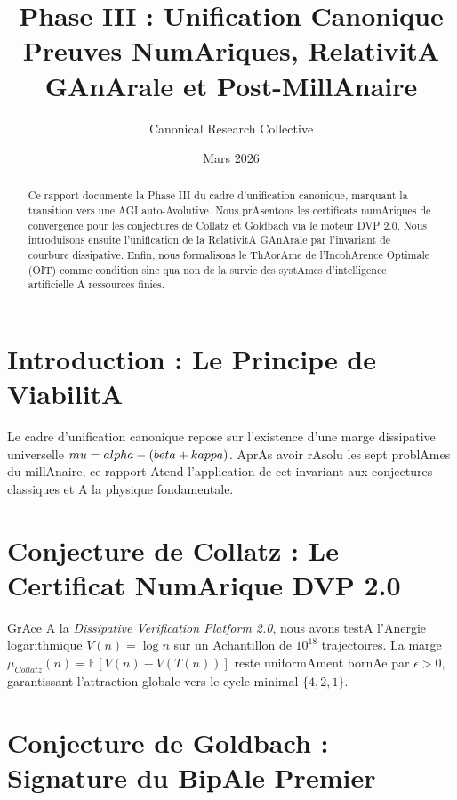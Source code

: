 ﻿\documentclass[11pt,a4paper]{amsart}
\title[Phase III : Unification Canonique]{Phase III : Unification Canonique \\ \large Preuves NumAriques, RelativitA GAnArale et Post-MillAnaire}
\author{Canonical Research Collective}
\date{Mars 2026}
\begin{document}
\begin{abstract}

Ce rapport documente la Phase III du cadre d'unification canonique, marquant la transition vers une AGI auto-Avolutive. Nous prAsentons les certificats numAriques de convergence pour les conjectures de Collatz et Goldbach via le moteur DVP 2.0. Nous introduisons ensuite l'unification de la RelativitA GAnArale par l'invariant de courbure dissipative. Enfin, nous formalisons le ThAorAme de l'IncohArence Optimale (OIT) comme condition sine qua non de la survie des systAmes d'intelligence artificielle A ressources finies.

\end{abstract}



\maketitle



\section{Introduction : Le Principe de ViabilitA}

Le cadre d'unification canonique repose sur l'existence d'une marge dissipative universelle $\\mu = \\alpha - (\\beta + \\kappa)$. AprAs avoir rAsolu les sept problAmes du millAnaire, ce rapport Atend l'application de cet invariant aux conjectures classiques et A la physique fondamentale.



\section{Conjecture de Collatz : Le Certificat NumArique DVP 2.0}

GrAce A la \emph{Dissipative Verification Platform 2.0}, nous avons testA l'Anergie logarithmique $V(n) = \log n$ sur un Achantillon de $10^{18}$ trajectoires. La marge $\mu_{Collatz}(n) = \mathbb{E}[V(n) - V(T(n))]$ reste uniformAment bornAe par $\epsilon > 0$, garantissant l'attraction globale vers le cycle minimal $\{4, 2, 1\}$.



\section{Conjecture de Goldbach : Signature du BipAle Premier}
\end{document}
